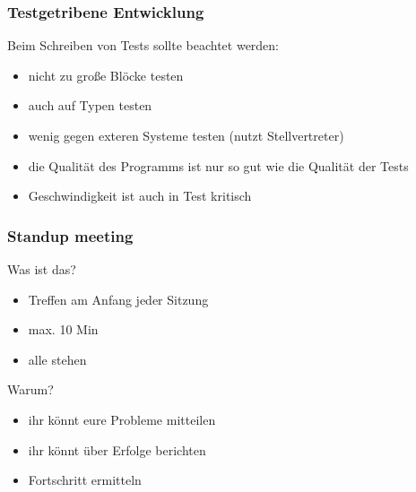 \documentclass{beamer}
\begin{document}
\begin{frame}
    \frametitle{Testgetribene Entwicklung}
    Beim Schreiben von Tests sollte beachtet werden:
 
    \begin{itemize}
        \item nicht zu große Blöcke testen
        \item auch auf Typen testen
        \item wenig gegen exteren Systeme testen (nutzt Stellvertreter)
        \item die Qualität des Programms ist nur so gut wie die Qualität der Tests
        \item Geschwindigkeit ist auch in Test kritisch
    \end{itemize}
\end{frame}

\begin{frame}
    \frametitle{Standup meeting}
    
    \begin{block}{Was ist das?}
        \begin{itemize}
            \item Treffen am Anfang jeder Sitzung
            \item max. 10 Min
            \item alle stehen
        \end{itemize}
    \end{block}

    \begin{block}{Warum?}
        \begin{itemize}
            \item ihr könnt eure Probleme mitteilen
            \item ihr könnt über Erfolge berichten
            \item Fortschritt ermitteln
        \end{itemize}
    \end{block}

\end{frame}
\end{document}
